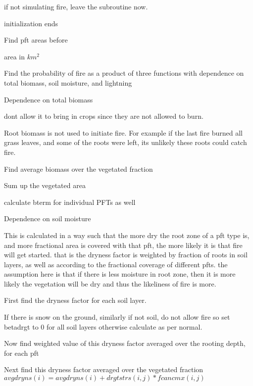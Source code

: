 if not simulating fire, leave the subroutine now.

initialization ends

Find pft areas before

area in $km^2$

Find the probability of fire as a product of three functions with dependence on total biomass, soil moisture, and lightning


\begin{DoxyEnumerate}
\item Dependence on total biomass
\end{DoxyEnumerate}

don\textquotesingle{}t allow it to bring in crops since they are not allowed to burn.

Root biomass is not used to initiate fire. For example if the last fire burned all grass leaves, and some of the roots were left, its unlikely these roots could catch fire.

Find average biomass over the vegetated fraction

Sum up the vegetated area

calculate bterm for individual P\+F\+Ts as well


\begin{DoxyEnumerate}
\item Dependence on soil moisture
\end{DoxyEnumerate}

This is calculated in a way such that the more dry the root zone of a pft type is, and more fractional area is covered with that pft, the more likely it is that fire will get started. that is the dryness factor is weighted by fraction of roots in soil layers, as well as according to the fractional coverage of different pfts. the assumption here is that if there is less moisture in root zone, then it is more likely the vegetation will be dry and thus the likeliness of fire is more.

First find the dryness factor for each soil layer.

If there is snow on the ground, similarly if not soil, do not allow fire so set betadrgt to 0 for all soil layers otherwise calculate as per normal.

Now find weighted value of this dryness factor averaged over the rooting depth, for each pft

Next find this dryness factor averaged over the vegetated fraction $avgdryns(i) = avgdryns(i) + drgtstrs(i,j)*fcancmx(i,j)$

